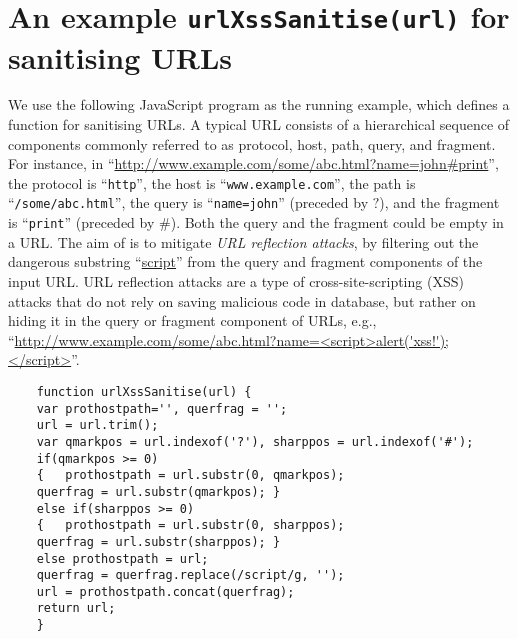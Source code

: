 
\section{An example {\tt urlXssSanitise(url)} for sanitising URLs} \label{app:urlexample} \label{exmp:running}



%


We use the following JavaScript program as the running example,
which defines a function {\urlxsssanitise} for sanitising URLs. A typical URL consists of a hierarchical sequence of components commonly referred to as protocol, host, path, query, and fragment. For instance, in ``\url{http://www.example.com/some/abc.html?name=john#print}'', the protocol is ``{\tt http}'', the host is ``{\tt www.example.com}'', the path is ``{\tt /some/abc.html}'', the query is ``{\tt name=john}'' (preceded by $?$), and the fragment is ``{\tt print}'' (preceded by $\#$). Both the query and the fragment could be empty in a URL. The aim of {\urlxsssanitise} is to mitigate \emph{URL reflection attacks}, %
by filtering out the dangerous substring ``\url{script}'' from the query and fragment components of  the input URL. URL reflection attacks are a type of cross-site-scripting (XSS) attacks that do not rely on saving malicious code in database, but rather on hiding it in the query or fragment component of URLs, e.g., ``\url{http://www.example.com/some/abc.html?name=<script>alert('xss!');</script>}''.

{\small
	\begin{verbatim}
	function urlXssSanitise(url) {
	var prothostpath='', querfrag = '';
	url = url.trim();
	var qmarkpos = url.indexof('?'), sharppos = url.indexof('#');
	if(qmarkpos >= 0) 
	{   prothostpath = url.substr(0, qmarkpos);
	querfrag = url.substr(qmarkpos); }
	else if(sharppos >= 0)
	{   prothostpath = url.substr(0, sharppos);
	querfrag = url.substr(sharppos); }
	else prothostpath = url;
	querfrag = querfrag.replace(/script/g, '');
	url = prothostpath.concat(querfrag);
	return url;
	}
	\end{verbatim}
}

